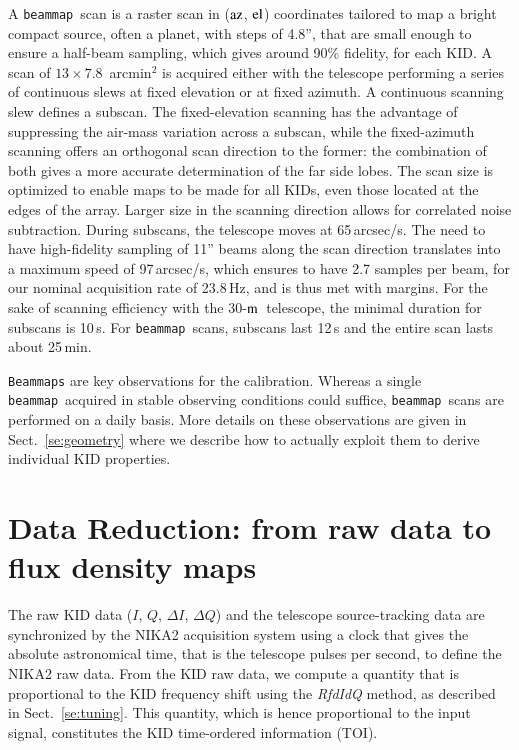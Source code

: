 \documentclass[traditionalabstract]{aa}
\newcommand{\elev}{\rm{el}}
\newcommand{\az}{\rm{az}}
\newcommand{\bm}{{\tt beammap}}
\newcommand{\trentemetre}{30-$\rm{m}$}
\newcommand{\lp}[1]{#1}
\newcommand{\rev}[1]{#1}
\begin{document}
A \bm\ scan is a raster scan in ($\az$, $\elev$) coordinates tailored to map a
bright compact source, often a planet, with steps of 4.8'', that are
small enough
{\rev to ensure a half-beam sampling, which gives around 90\% fidelity, for
each KID.} 
A scan of 
$13\times7.8$~arcmin$^2$ is acquired either with the telescope
performing a series of continuous slews at fixed elevation or at fixed azimuth. 
A continuous scanning slew defines a subscan. 
The fixed-elevation scanning has the advantage of suppressing the air-mass variation
across a subscan, while the fixed-azimuth scanning offers an
orthogonal scan direction to the former:
the combination of both gives a more accurate determination of the far side
lobes.
The scan size is optimized to enable maps to be made for all
KIDs, even those located at the edges of the array. Larger size in the scanning
direction allows for correlated noise subtraction.
During subscans, the telescope moves at
65\,arcsec/s.
{\rev The need to have high-fidelity sampling of 11'' beams 
along the scan direction translates into a maximum speed of
97\,arcsec/s, which ensures to have 2.7 samples per beam, for our nominal
acquisition rate of 23.8\,Hz,} and is thus met with margins. For the
sake of scanning efficiency with the \trentemetre\ telescope, the minimal duration for
subscans is 10\,s. For \bm\ scans,
subscans last 12\,s and the entire scan lasts about 25\,min.

{\tt Beammaps} are key observations for the calibration. {\lp Whereas
a single \bm\ acquired in stable observing conditions could suffice,
\bm\ scans are performed on a daily basis.}
More details on these observations are given in Sect.~\ref{se:geometry}
where we describe how to actually exploit them to derive individual KID
properties.


\section{Data Reduction: from raw data to flux density maps}
\label{se:dataproc}
%

The raw KID data ($I$, $Q$, $\Delta I$, $\Delta Q$) and the telescope
source-tracking data are synchronized by the NIKA2 acquisition system using a
clock that gives the absolute astronomical time, that is the telescope
pulses per second, to define the NIKA2 raw data. From the KID raw
data, we compute a quantity that is proportional to the KID
frequency shift using the \emph{RfdIdQ} method, as described in
Sect.~\ref{se:tuning}. This quantity, which is hence proportional to
the input signal, constitutes the KID time-ordered information (TOI).
\end{document}
